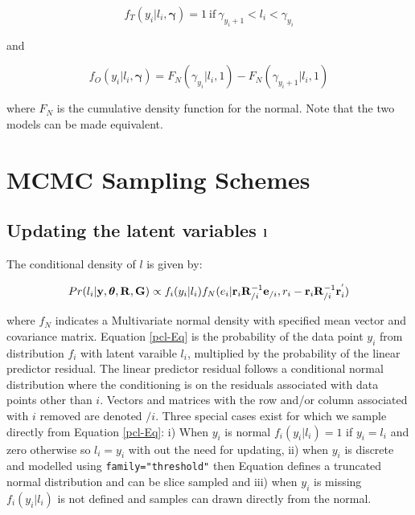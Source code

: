 \documentclass{article}
\begin{document}
\begin{equation}
f_{T}(y_{i} | l_{i}, {\bm \gamma}) = 1\ \textrm{if}\ \gamma_{y_{i}+1} <  l_{i} < \gamma_{y_{i}}
\end{equation}

and

\begin{equation}
f_{O}(y_{i} | l_{i}, {\bm \gamma}) = F_{N}(\gamma_{y_{i}} | l_{i}, 1)-F_{N}(\gamma_{y_{i}+1} | l_{i},1)
\end{equation}  

where $F_{N}$ is the cumulative density function for the normal. Note that the two models can be made equivalent.

\section{MCMC Sampling Schemes}
\label{MCMC-app}

\subsection[Updating the latent variables]{Updating the latent variables ${\bf l}$}

The conditional density of $l$ is given by:

\begin{equation}
Pr(l_{i}| {\bf y}, {\bm \theta}, {\bf R}, {\bf G}) \propto  f_{i}(y_{i} | l_{i})f_{N}(e_{i}|{\bf r}_{i}{\bf R}_{/i}^{-1}{\bf e}_{/i}, r_{i}-{\bf r}_{i}{\bf R}_{/i}^{-1}{\bf r}^{'}_{i})
\label{pcl-Eq}
\end{equation}

where $f_{N}$ indicates a Multivariate normal density with specified mean vector and covariance matrix.  Equation \ref{pcl-Eq} is the probability of the data point $y_{i}$ from distribution $f_{i}$ with latent varaible $l_{i}$, multiplied by the probability of the linear predictor residual. The linear predictor residual follows a conditional normal distribution where the conditioning is on the residuals associated with data points other than $i$. Vectors and matrices with the row and/or column associated with $i$ removed are denoted $/i$.  Three special cases exist for which we sample directly from Equation \ref{pcl-Eq}: i) When $y_{i}$ is normal $f_{i}(y_{i} | l_{i})=1$ if $y_{i}=l_{i}$ and zero otherwise so $l_{i}=y_{i}$ with out the need for updating, ii) when $y_{i}$ is discrete and modelled using \texttt{family="threshold"} then Equation \label{pcl-Eq} defines a truncated normal distribution and can be slice sampled \citep{Robert.1995} and iii) when $y_{i}$ is missing $f_{i}(y_{i} | l_{i})$ is not defined and samples can drawn directly from the normal.
\\
\end{document}
